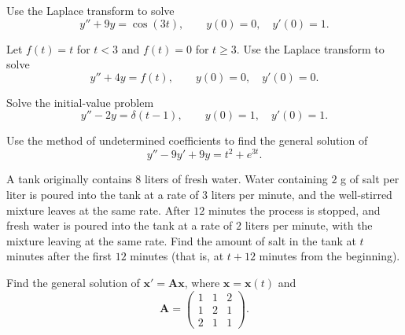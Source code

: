 \documentclass[11pt,oneside]{article}
\begin{document}
\begin{problem}
Use the Laplace transform to solve
\[
y''+9y=\cos(3t),\qquad y(0)=0,\quad y'(0)=1.
\]
\end{problem}

\begin{problem}
Let $f(t)=t$ for $t<3$ and $f(t)=0$ for $t\ge3$. Use the Laplace transform to solve
\[
y''+4y=f(t),\qquad y(0)=0,\quad y'(0)=0.
\]
\end{problem}

\begin{problem}
Solve the initial-value problem
\[
y''-2y=\delta(t-1),\qquad y(0)=1,\quad y'(0)=1.
\]
\end{problem}

\begin{problem}
Use the method of undetermined coefficients to find the general solution of
\[
y''-9y'+9y=t^2+e^{3t}.
\]
\end{problem}

\begin{problem}
A tank originally contains $8$ liters of fresh water. Water containing $2$ g of salt per liter is poured into the tank at a rate of $3$ liters per minute, and the well-stirred mixture leaves at the same rate. After $12$ minutes the process is stopped, and fresh water is poured into the tank at a rate of $2$ liters per minute, with the mixture leaving at the same rate. Find the amount of salt in the tank at $t$ minutes after the first $12$ minutes (that is, at $t+12$ minutes from the beginning).
\end{problem}

\begin{problem}
Find the general solution of $\mathbf x'=\mathbf A\mathbf x$, where $\mathbf x=\mathbf x(t)$ and
\[
\mathbf A=\begin{pmatrix}1&1&2\\1&2&1\\2&1&1\end{pmatrix}.
\]
\end{problem}
\end{document}
